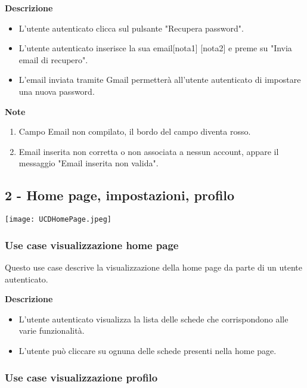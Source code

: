 \documentclass[a4paper,12pt]{article}
\begin{document}
\textbf{Descrizione}
\begin{itemize} \setlength\itemsep{0.01em}
\item L'utente autenticato clicca sul pulsante "Recupera password".
\item L'utente autenticato inserisce la sua email[nota1] [nota2] e preme su "Invia email di recupero".
\item L'email inviata tramite Gmail permetterà all'utente autenticato di impostare una nuova password.
\end{itemize}

\textbf{Note}
\begin{enumerate} \setlength\itemsep{0.01em}
\item Campo Email non compilato, il bordo del campo diventa rosso.
\item Email inserita non corretta o non associata a nessun account, appare il messaggio "Email inserita non valida".
\end{enumerate}


\subsection*{2 - Home page, impostazioni, profilo}
\begin{center}
  \texttt{[image: UCDHomePage.jpeg]}
\end{center}


\subsubsection*{Use case visualizzazione home page}

Questo use case descrive la visualizzazione della home page da parte di un utente autenticato.

\textbf{Descrizione}
\begin{itemize} \setlength\itemsep{0.01em}
\item L'utente autenticato visualizza la lista delle schede che corrispondono alle varie funzionalità.
\item L'utente può cliccare su ognuna delle schede presenti nella home page.
\end{itemize}


\subsubsection*{Use case visualizzazione profilo}
\end{document}
